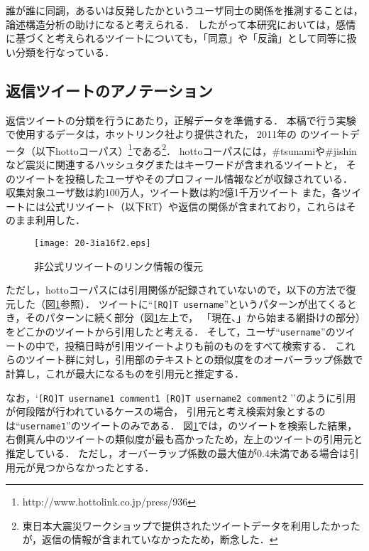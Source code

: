 \documentclass[japanese]{jnlp_1.4}
\newcommand{\addspan}[1]{}
\begin{document}
\addspan{
(\ref{ex:agree2})(\ref{ex:counter2})(\ref{ex:counter3})のような感情的な同調あるいは反発のツイートは，内容（引用の場合は付加部分）には有用な情報は含まれていないが，
}
誰が誰に同調，あるいは反発したかというユーザ同士の関係を推測することは，論述構造分析の助けになると考えられる．
したがって本研究においては，感情に基づくと考えられるツイートについても，「同意」や「反論」として同等に扱い分類を行なっている．


\subsection{返信ツイートのアノテーション}

返信ツイートの分類を行うにあたり，正解データを準備する．
本稿で行う実験で使用するデータは，ホットリンク社より提供された，
2011年の\addspan{3月11日から3月29日まで}
のツイートデータ（以下hottoコーパス）\footnote{http://www.hottolink.co.jp/press/936}である\footnote{東日本大震災ワークショップで提供されたツイートデータを利用したかったが，返信の情報が含まれていなかったため，断念した．}．
hottoコーパスには，\#tsunamiや\#jishinなど震災に関連するハッシュタグまたはキーワードが含まれるツイートと，
そのツイートを投稿したユーザやそのプロフィール情報などが収録されている．
収集対象ユーザ数は約100万人，ツイート数は約2億1千万ツイート\addspan{であり，本
研究では全てのデータを利用した．}
また，各ツイートには公式リツイート（以下RT）や返信の関係が含まれており，これらはそのまま利用した．

\begin{figure}[b]
  \begin{center}
   \texttt{[image: 20-3ia16f2.eps]}
  \end{center}
  \caption{非公式リツイートのリンク情報の復元}
  \label{fig:recognizing-qts}
\end{figure}

ただし，hottoコーパスには引用関係が記録されていないので，以下の方法で復元した（図\ref{fig:recognizing-qts}参照）．
ツイートに``\texttt{[RQ]T username}''というパターンが出てくるとき，そのパターンに続く部分（図\ref{fig:recognizing-qts}左上で，
「現在、」から始まる網掛けの部分）をどこかのツイートから引用したと考える．
そして，ユーザ``\texttt{username}''のツイートの中で，投稿日時が引用ツイートよりも前のものをすべて検索する．
これらのツイート群に対し，引用部のテキストとの類似度を\addspan{文字トライグラム}のオーバーラップ係数で計算し，これが最大になるものを引用元と推定する．
\addspan{
オーバーラップ係数は，文字トライグラムの集合XとYに対し，以下の式で定義される．
{
\[
オーバーラップ係数 = \frac{|X \cap Y|}{\min \{|X|, |Y|\}}
\]
}}
なお，`\texttt{[RQ]T username1 comment1 [RQ]T username2 comment2} ''のように引用が何段階が行われているケースの場合，
引用元と考え検索対象とするのは``\texttt{username1}''のツイートのみである．
図\ref{fig:recognizing-qts}では，\addspan{あるユーザ}のツイートを検索した結果，右側真ん中のツイートの類似度が最も高かったため，左上のツイートの引用元と推定している．
ただし，オーバーラップ係数の最大値が0.4未満である場合は引用元が見つからなかったとする．
\end{document}
